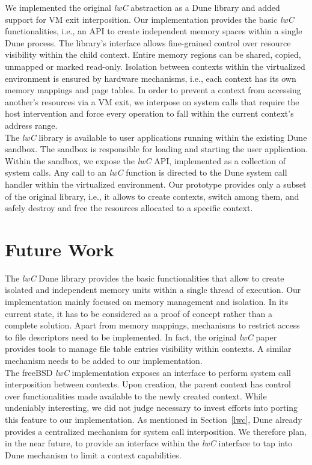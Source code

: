 \documentclass[letterpaper,twocolumn,10pt]{article}
\begin{document}
We implemented the original \emph{lwC} abstraction as a Dune library and added support for VM exit interposition.
Our implementation provides the basic \emph{lwC} functionalities, i.e., an API to create independent memory spaces within a single Dune process.
The library's interface allows fine-grained control over resource visibility within the child context.
Entire memory regions can be shared, copied, unmapped or marked read-only.
Isolation between contexts within the virtualized environment is ensured by hardware mechanisms, i.e., each context has its own memory mappings and page tables.
In order to prevent a context from accessing another's resources via a VM exit, we interpose on system calls that require the host intervention and force every operation to fall within the current context's address range.\\

The \emph{lwC} library is available to user applications running within the existing Dune sandbox.
The sandbox is responsible for loading and starting the user application.
Within the sandbox, we expose the \emph{lwC} API, implemented as a collection of system calls.
Any call to an \emph{lwC} function is directed to the Dune system call handler within the virtualized environment.
Our prototype provides only a subset of the original library, i.e., it allows to create contexts, switch among them, and safely destroy and free the resources allocated to a specific context.

\section{Future Work}\label{future}
The \emph{lwC} Dune library provides the basic functionalities that allow to create isolated and independent memory units within a single thread of execution.
Our implementation mainly focused on memory management and isolation.
In its current state, it has to be considered as a proof of concept rather than a complete solution.
Apart from memory mappings, mechanisms to restrict access to file descriptors need to be implemented.
In fact, the original \emph{lwC} paper provides tools to manage file table entries visibility within contexts.
A similar mechanism needs to be added to our implementation.\\

The freeBSD \emph{lwC} implementation exposes an interface to perform system call interposition between contexts.
Upon creation, the parent context has control over functionalities made available to the newly created context.
While undeniably interesting, we did not judge necessary to invest efforts into porting this feature to our implementation.
As mentioned in Section~\ref{lwc}, Dune already provides a centralized mechanism for system call interposition.
We therefore plan, in the near future, to provide an interface within the \emph{lwC} interface to tap into Dune mechanism to limit a context capabilities.\\
\end{document}
